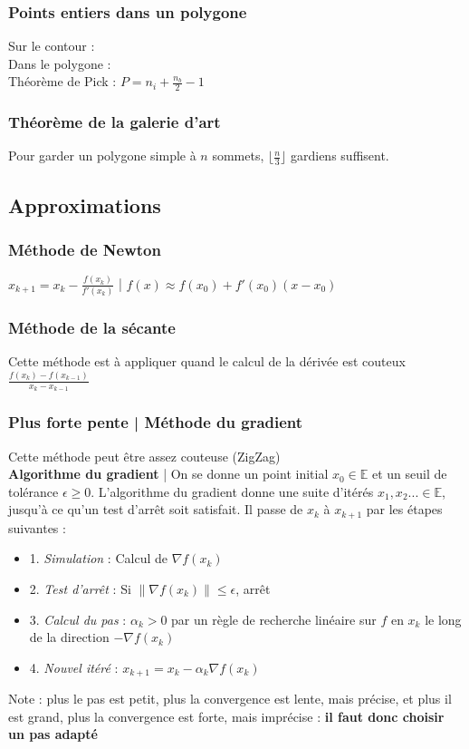 \documentclass[8pt]{article}
\begin{document}
            \subsubsection{Points entiers dans un polygone}
                Sur le contour : \\
                Dans le polygone : \\
                Théorème de Pick :
                $P = n_{i} + \frac{n_{b}}{2}-1$
            \subsubsection{Théorème de la galerie d'art}
            Pour garder un polygone simple à $n$ sommets, $\lfloor \frac{n}{3} \rfloor$ gardiens suffisent.
        \subsection{Approximations}
            \subsubsection{Méthode de Newton}
            $x_{k+1} = x_{k} - \frac{f(x_{k})}{f'(x_{k})}$ | $f(x) \approx f(x_{0}) + f'(x_{0})(x-x_{0})$
            \subsubsection{Méthode de la sécante}
            Cette méthode est à appliquer quand le calcul de la dérivée est couteux
            $\frac{f(x_{k} )- f(x_{k-1})}{x_{k} - x_{k-1}}$
            \subsubsection{Plus forte pente | Méthode du gradient}
            Cette méthode peut être assez couteuse (ZigZag) \\
            \textbf{Algorithme du gradient} | On se donne un point initial $x_0 \in \mathbb{E}$ et un seuil de tolérance
            $\epsilon \geq 0$. L'algorithme du gradient donne une suite d'itérés $x_1 , x_2 ... \in \mathbb{E}$, jusqu'à ce qu'un test d'arrêt
            soit satisfait. Il passe de $x_k$ à $x_{k+1}$ par les étapes suivantes :
            \begin{itemize}
                \item 1. \textit{Simulation} : Calcul de $\nabla f(x_k)$
                \item 2. \textit{Test d'arrêt} : Si $\lVert \nabla f(x_k) \rVert \leq \epsilon$, arrêt 
                \item 3. \textit{Calcul du pas} : $\alpha_k > 0$ par un règle de recherche linéaire sur $f$ en $x_k$
                le long de la direction $-\nabla f(x_k)$
                \item 4. \textit{Nouvel itéré} : $x_{k+1} = x_k - \alpha_k \nabla f(x_k)$ 
            \end{itemize}
            Note : plus le pas est petit, plus la convergence est lente, mais précise, et plus il est grand, plus la convergence est forte, mais imprécise : \textbf{il faut donc choisir un pas adapté}
\end{document}
